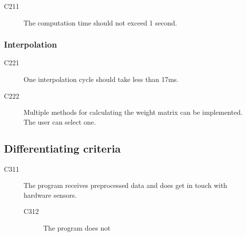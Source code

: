 	\begin{description}
		\item[C211] The computation time should not exceed 1 second.
	\end{description}
	
	\subsubsection{Interpolation}
	\begin{description}
		\item[C221] One interpolation cycle should take less than 17ms.
		\item[C222] Multiple methods for calculating the weight matrix can be implemented. The user can select one.
	\end{description}
	
	
	\subsection{Differentiating criteria}
	\begin{description}
		\item[C311] The program receives preprocessed data and does get in touch with hardware sensors.
	\begin{description}
		\item[C312] The program does not %
	\end{description}
	\end{description}



	

